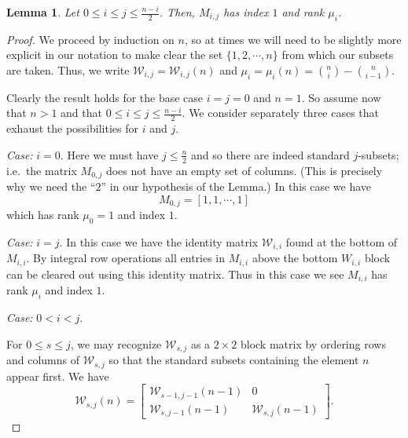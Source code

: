 \documentclass[11pt]{article}
\newtheorem{lemma}[theo]{Lemma}
\theoremstyle{definition}
\providecommand{\ie}{i.e.\ }
\numberwithin{equation}{section}
\numberwithin{equation}{section}
\newcommand{\W}{\mathcal{W}}
\begin{document}
\begin{lemma}\label{l:mind1}
Let $0 \leq i \leq j \leq \frac{n-i}{2}$.  Then, $M_{i,j}$ has index $1$ and rank $\mu_i$.
\end{lemma}
\begin{proof}
We proceed by induction on $n$, so at times we will need to be slightly more explicit in our notation to make clear the set $\{1, 2, \cdots , n\}$ from which our subsets are taken.  Thus, we write $\W_{i,j} = \W_{i,j}(n)$ and $\mu_{i} = \mu_{i}(n) = \binom{n}{i} - \binom{n}{i-1}$.  

Clearly the result holds for the base case $i=j=0$ and $n=1$.  So assume now that $n>1$ and that $0 \leq i \leq j \leq \frac{n-i}{2}$.  We consider separately three cases that exhaust the possibilities for $i$ and $j$.

\textit{Case:} $i=0$.  Here we must have $j \leq \frac{n}{2}$ and so there are indeed standard $j$-subsets; \ie the matrix $M_{0,j}$ does not have an empty set of columns. (This is precisely why we need the ``$2$'' in our hypothesis of the Lemma.)  In this case we have
\[
M_{0,j} = [1, 1, \cdots, 1]
\]
which has rank $\mu_{0} = 1$ and index $1$.

\textit{Case:} $i = j$.  In this case we have the identity matrix $\W_{i,i}$ found at the bottom of $M_{i,i}$.  By integral row operations all entries in $M_{i,i}$ above the bottom $W_{i,i}$ block can be cleared out using this identity matrix.  Thus in this case we see $M_{i,i}$ has rank $\mu_{i}$ and index $1$.

\textit{Case:}  $0<i<j$.  

For $0 \leq s \leq j$, we may recognize $\W_{s,j}$ as a $2 \times 2$ block matrix by ordering rows and columns of $\W_{s,j}$ so that the standard subsets containing the element $n$ appear first.  We have  
\[
\W_{s,j}(n) = 
\left [ \begin{array}{c|c}
\W_{s-1,j-1}(n-1) & 0 \\
\hline
\W_{s,j-1}(n-1) & \W_{s,j}(n-1)
\end{array} \right ].
\]


\end{proof}
\end{document}
